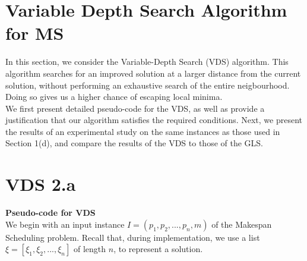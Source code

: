 \documentclass[12pt,a4paper,reqno]{article}
\begin{document}
\newpage













\section{Variable Depth Search Algorithm for MS} \label{sec:VDS}

In this section, we consider the Variable-Depth Search (VDS) algorithm. This algorithm searches for an improved solution at a larger distance from the current solution, without performing an exhaustive search of the entire neigbourhood. Doing so gives us a higher chance of escaping local minima. \\

We first present detailed pseudo-code for the VDS, as well as provide a justification that our algorithm satisfies the required conditions. Next, we present the results of an experimental study on the same instances as those used in Section 1(d), and compare the results of the VDS to those of the GLS.

\section*{VDS 2.a}
\textbf{Pseudo-code for VDS}\\
We begin with an input instance $I = (p_1,p_2,...,p_n,m)$ of the Makespan Scheduling problem. Recall that, during implementation, we use a list $\xi = [\xi_1,\xi_2,...,\xi_n]$ of length $n$, to represent a solution.
\end{document}
